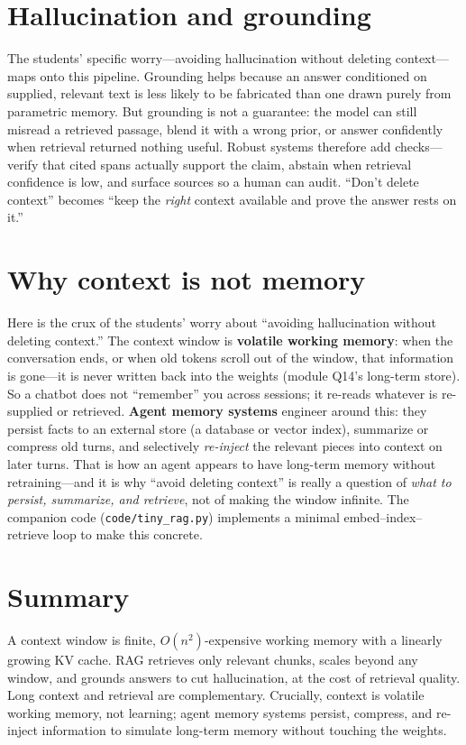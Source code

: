 \documentclass[11pt]{article}
\begin{document}
\section{Hallucination and grounding}
The students' specific worry---avoiding hallucination without deleting context---maps onto this pipeline.
Grounding helps because an answer conditioned on supplied, relevant text is less likely to be fabricated
than one drawn purely from parametric memory. But grounding is not a guarantee: the model can still
misread a retrieved passage, blend it with a wrong prior, or answer confidently when retrieval returned
nothing useful. Robust systems therefore add checks---verify that cited spans actually support the claim,
abstain when retrieval confidence is low, and surface sources so a human can audit. ``Don't delete
context'' becomes ``keep the \emph{right} context available and prove the answer rests on it.''

\section{Why context is not memory}
Here is the crux of the students' worry about ``avoiding hallucination without deleting context.'' The
context window is \textbf{volatile working memory}: when the conversation ends, or when old tokens scroll
out of the window, that information is gone---it is never written back into the weights (module Q14's
long-term store). So a chatbot does not ``remember'' you across sessions; it re-reads whatever is re-supplied
or retrieved. \textbf{Agent memory systems} engineer around this: they persist facts to an external store
(a database or vector index), summarize or compress old turns, and selectively \emph{re-inject} the
relevant pieces into context on later turns. That is how an agent appears to have long-term memory without
retraining---and it is why ``avoid deleting context'' is really a question of \emph{what to persist,
summarize, and retrieve}, not of making the window infinite. The companion code
(\texttt{code/tiny\_rag.py}) implements a minimal embed--index--retrieve loop to make this concrete.

\section{Summary}
A context window is finite, $O(n^2)$-expensive working memory with a linearly growing KV cache. RAG
retrieves only relevant chunks, scales beyond any window, and grounds answers to cut hallucination, at the
cost of retrieval quality. Long context and retrieval are complementary. Crucially, context is volatile
working memory, not learning; agent memory systems persist, compress, and re-inject information to simulate
long-term memory without touching the weights.



\end{document}
